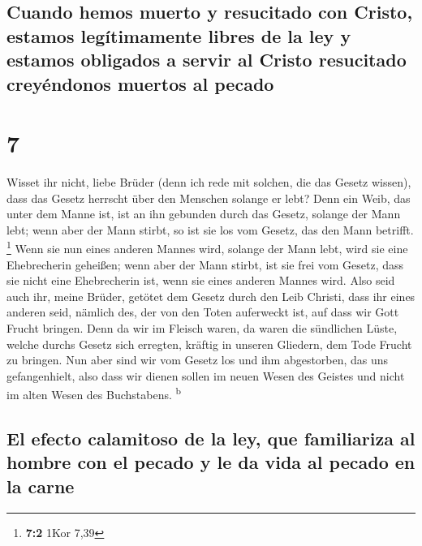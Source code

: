 \hypertarget{cuando-hemos-muerto-y-resucitado-con-cristo-estamos-leguxedtimamente-libres-de-la-ley-y-estamos-obligados-a-servir-al-cristo-resucitado-creyuxe9ndonos-muertos-al-pecado}{%
\subsection{Cuando hemos muerto y resucitado con Cristo, estamos
legítimamente libres de la ley y estamos obligados a servir al Cristo
resucitado creyéndonos muertos al
pecado}\label{cuando-hemos-muerto-y-resucitado-con-cristo-estamos-leguxedtimamente-libres-de-la-ley-y-estamos-obligados-a-servir-al-cristo-resucitado-creyuxe9ndonos-muertos-al-pecado}}

\hypertarget{section-6}{%
\section{7}\label{section-6}}

 Wisset ihr nicht, liebe Brüder (denn ich rede mit
solchen, die das Gesetz wissen), dass das Gesetz herrscht über den
Menschen solange er lebt?  Denn ein Weib, das unter dem
Manne ist, ist an ihn gebunden durch das Gesetz, solange der Mann lebt;
wenn aber der Mann stirbt, so ist sie los vom Gesetz, das den Mann
betrifft. \footnote{\textbf{7:2} 1Kor 7,39}  Wenn sie nun
eines anderen Mannes wird, solange der Mann lebt, wird sie eine
Ehebrecherin geheißen; wenn aber der Mann stirbt, ist sie frei vom
Gesetz, dass sie nicht eine Ehebrecherin ist, wenn sie eines anderen
Mannes wird.  Also seid auch ihr, meine Brüder, getötet
dem Gesetz durch den Leib Christi, dass ihr eines anderen seid, nämlich
des, der von den Toten auferweckt ist, auf dass wir Gott Frucht bringen.
 Denn da wir im Fleisch waren, da waren die sündlichen
Lüste, welche durchs Gesetz sich erregten, kräftig in unseren Gliedern,
dem Tode Frucht zu bringen.  Nun aber sind wir vom Gesetz
los und ihm abgestorben, das uns gefangenhielt, also dass wir dienen
sollen im neuen Wesen des Geistes und nicht im alten Wesen des
Buchstabens. \textsuperscript{b}

\hypertarget{el-efecto-calamitoso-de-la-ley-que-familiariza-al-hombre-con-el-pecado-y-le-da-vida-al-pecado-en-la-carne}{%
\subsection{El efecto calamitoso de la ley, que familiariza al hombre
con el pecado y le da vida al pecado en la
carne}\label{el-efecto-calamitoso-de-la-ley-que-familiariza-al-hombre-con-el-pecado-y-le-da-vida-al-pecado-en-la-carne}}

